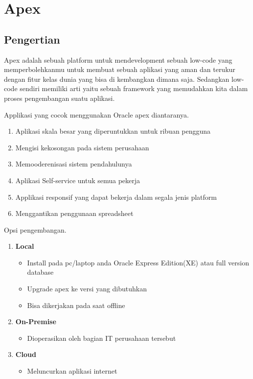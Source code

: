 \chapter{Apex}
\section{Pengertian}
Apex adalah sebuah platform untuk mendevelopment sebuah low-code yang memperbolehkanmu untuk membuat sebuah aplikasi yang aman dan terukur dengan fitur kelas dunia yang bisa di kembangkan dimana saja. Sedangkan low-code sendiri memiliki arti yaitu sebuah framework yang memudahkan kita dalam proses pengembangan suatu aplikasi.
\par 
Applikasi yang cocok menggunakan Oracle apex diantaranya.
\begin{enumerate}
\item Aplikasi skala besar yang diperuntukkan untuk ribuan pengguna
\item Mengisi kekosongan  pada sistem perusahaan
\item Memooderenisasi sistem pendahulunya
\item Aplikasi Self-service untuk semua pekerja
\item Applikasi responsif yang dapat bekerja dalam segala jenis platform
\item Menggantikan penggunaan spreadsheet
\end{enumerate}

Opsi pengembangan.
\begin{enumerate}
\item \textbf{Local} 
\begin{itemize}
\item Install pada pc/laptop anda Oracle Express Edition(XE) atau full version database
\item Upgrade apex ke versi yang dibutuhkan
\item Bisa dikerjakan pada saat offline
\end{itemize}

\item \textbf{On-Premise}
\begin{itemize}
\item Dioperasikan oleh bagian IT perusahaan tersebut
\end{itemize}

\item \textbf{Cloud}
\begin{itemize}
\item Meluncurkan aplikasi internet
\end{itemize}
\end{enumerate}


